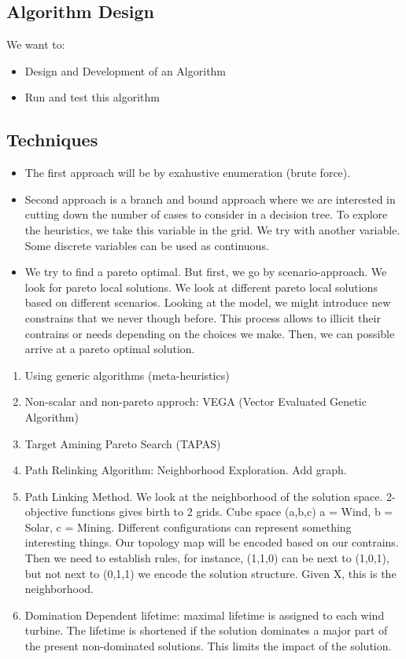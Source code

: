 \documentclass[12pt]{article}
\begin{document}
\subsection{Algorithm Design}

We want to:
\begin{itemize}
\item Design and Development of an Algorithm
\item Run and test this algorithm
\end{itemize}

\subsection{Techniques}

\begin{itemize}
\item The first approach will be by exahustive enumeration (brute force). 
\item Second approach is a branch and bound approach where we are interested in cutting down the number of cases to consider in a decision tree. To explore the heuristics, we take this variable in the grid. We try with another variable. Some discrete variables can be used as continuous. 
\item We try to find a pareto optimal. But first, we go by scenario-approach. We look for pareto local solutions. We look at different pareto local solutions based on different scenarios. Looking at the model, we might introduce new constrains that we never though before. This process allows to illicit their contrains or needs depending on the choices we make. Then, we can possible arrive at a pareto optimal solution. 
\end{itemize}

\begin{enumerate}
\item Using generic algorithms (meta-heuristics)
\item Non-scalar and non-pareto approch: VEGA (Vector Evaluated Genetic Algorithm)
\item Target Amining Pareto Search (TAPAS)
\item Path Relinking Algorithm: Neighborhood Exploration. Add graph.
\item  Path Linking Method. We look at the neighborhood of the solution space. 2-objective functions gives birth to 2 grids. Cube space (a,b,c) a = Wind, b = Solar, c = Mining. Different configurations can represent something interesting things. Our topology map will be encoded based on our contrains. Then we need to establish rules, for instance, (1,1,0) can be next to (1,0,1), but not next to (0,1,1) we encode the solution structure. Given X, this is the neighborhood.  
\item Domination Dependent lifetime: maximal lifetime is assigned to each wind turbine. The lifetime is shortened if the solution dominates a major part of the present non-dominated solutions. This limits the impact of the solution. 
\end{enumerate}
\end{document}
